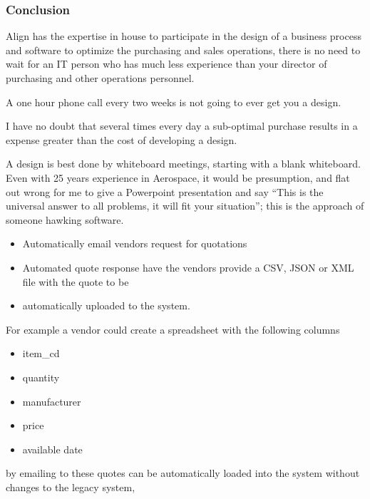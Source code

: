 \documentclass[letterpaper,10pt,english]{sphinxmanual}
\begin{document}
\subsubsection{Conclusion}
\label{\detokenize{FutureState:conclusion}}
Align has the expertise in house to participate in the design of a
business process and software to optimize the purchasing and sales
operations, there is no need to wait for an IT person who has much less
experience than your director of purchasing and other operations
personnel.

A one hour phone call every two weeks is not going to ever get you a
design.

I have no doubt that several times every day a sub-optimal purchase
results in a expense greater than the cost of developing a design.

A design is best done by whiteboard meetings, starting with a blank
whiteboard. Even with 25 years experience in Aerospace, it would be
presumption, and flat out wrong for me to give a Powerpoint
presentation and say “This is the universal answer to all problems, it
will fit your situation”; this is the approach of someone hawking
software.
\begin{itemize}
\item {} 
Automatically email vendors request for quotations

\item {} 
Automated quote response have the vendors provide a CSV, JSON or XML
file with the quote to be

\item {} 
automatically uploaded to the system.

\end{itemize}

For example a vendor could create a spreadsheet with the following
columns
\begin{itemize}
\item {} 
item\_cd

\item {} 
quantity

\item {} 
manufacturer

\item {} 
price

\item {} 
available date

\end{itemize}

by emailing to  these quotes can be automatically
loaded into the system without changes to the legacy system,
\end{document}
